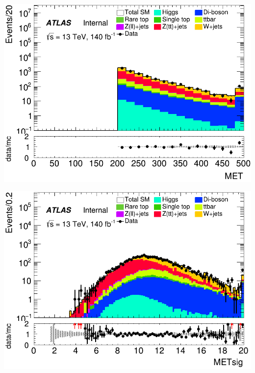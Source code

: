 \documentclass[usenames,dvipsnames]{beamer}
\begin{document}
\begin{frame}
    \vspace{0.5cm} %

    \begin{minipage}{0.32\textwidth}
        \centering
        \includegraphics[width=\textwidth]{graphics/H_met/H_met_MET.png}
    \end{minipage}
    \hfill
    \begin{minipage}{0.32\textwidth}
        \centering
        \includegraphics[width=\textwidth]{graphics/H_met/H_met_METsig.png}
    \end{minipage}
    \hfill
    
\end{frame}
\end{document}
